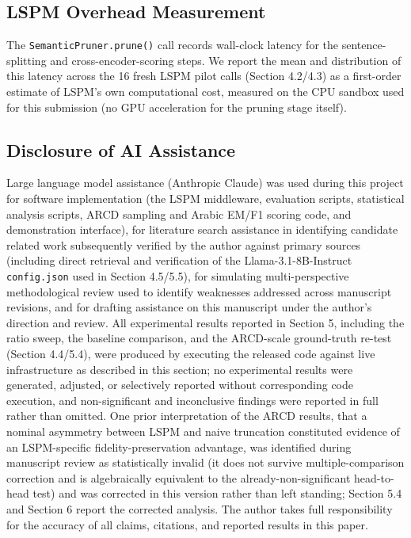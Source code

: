 \documentclass[pdflatex,sn-basic,Numbered]{sn-jnl}
\begin{document}
\subsection{LSPM Overhead Measurement}
The \texttt{SemanticPruner.prune()} call records wall-clock latency for the sentence-splitting and cross-encoder-scoring steps. We report the mean and distribution of this latency across the 16 fresh LSPM pilot calls (Section 4.2/4.3) as a first-order estimate of LSPM's own computational cost, measured on the CPU sandbox used for this submission (no GPU acceleration for the pruning stage itself).

\subsection{Disclosure of AI Assistance}
Large language model assistance (Anthropic Claude) was used during this project for software implementation (the LSPM middleware, evaluation scripts, statistical analysis scripts, ARCD sampling and Arabic EM/F1 scoring code, and demonstration interface), for literature search assistance in identifying candidate related work subsequently verified by the author against primary sources (including direct retrieval and verification of the Llama-3.1-8B-Instruct \texttt{config.json} used in Section 4.5/5.5), for simulating multi-perspective methodological review used to identify weaknesses addressed across manuscript revisions, and for drafting assistance on this manuscript under the author's direction and review. All experimental results reported in Section 5, including the ratio sweep, the baseline comparison, and the ARCD-scale ground-truth re-test (Section 4.4/5.4), were produced by executing the released code against live infrastructure as described in this section; no experimental results were generated, adjusted, or selectively reported without corresponding code execution, and non-significant and inconclusive findings were reported in full rather than omitted. One prior interpretation of the ARCD results, that a nominal asymmetry between LSPM and naive truncation constituted evidence of an LSPM-specific fidelity-preservation advantage, was identified during manuscript review as statistically invalid (it does not survive multiple-comparison correction and is algebraically equivalent to the already-non-significant head-to-head test) and was corrected in this version rather than left standing; Section 5.4 and Section 6 report the corrected analysis. The author takes full responsibility for the accuracy of all claims, citations, and reported results in this paper.
\end{document}
